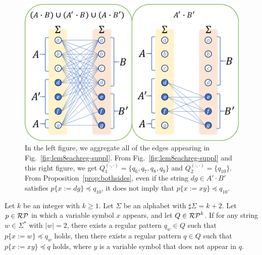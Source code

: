 \begin{figure}[t]
  \begin{center}
    \includegraphics[scale=0.8]{figs/lem8totalreg-suppl.png}
    \caption{In the left figure, we aggregate all of the edges appearing in Fig.~\ref{fig:lem8eachreg-suppl}. From Fig.~\ref{fig:lem8eachreg-suppl} and this right figure, we get $Q_{1}^{(\cdot,\cdot)}=\{q_6,q_7,q_8,q_9\}$ and $Q_{2}^{(\cdot,\cdot)}=\{q_{10}\}$. From Proposition~\ref{prop:bothsides}, even if the string $dg \in A'\cdot B'$ satisfies {\color{red}$p \{ x:=dg \} \preceq q_{10}$}, it does not imply that $p \{ x:=xy \} \preceq q_{10}$.}\label{fig:lem8totalreg-suppl}
  \end{center}
\end{figure}

\begin{lem}\label{Add-Lemma01}
Let $k$ be an integer with $k\geq 1$.
Let $\Sigma$ be an alphabet with $\sharp \Sigma = k + 2$.
Let $p \in \mathcal{RP}$ in which a variable symbol $x$ appears, and let $Q \in \mathcal{RP}^{k}$.
If for any string $w \in \Sigma^{\ast}$ with $|w|=2$, there exists a regular pattern $q_{w} \in Q$ such that $p \{ x:=w \} \preceq q_{w}$ holds, then there exists a regular pattern $q \in Q$ such that $p \{ x:=xy \} \preceq q$ holds, where $y$ is a variable symbol that does not appear in $q$.
\end{lem}


